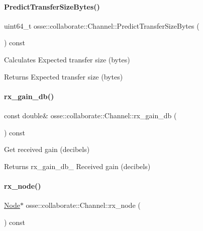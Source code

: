 \paragraph{\texorpdfstring{Predict\+Transfer\+Size\+Bytes()}{PredictTransferSizeBytes()}}
{\footnotesize\ttfamily uint64\+\_\+t osse\+::collaborate\+::\+Channel\+::\+Predict\+Transfer\+Size\+Bytes (\begin{DoxyParamCaption}{ }\end{DoxyParamCaption}) const}



Calculates Expected transfer size (bytes) 

\begin{DoxyReturn}{Returns}
Expected transfer size (bytes) 
\end{DoxyReturn}
\mbox{\label{classosse_1_1collaborate_1_1_channel_a4027ef876124bbe4cf0bd4b00acaf884}} 
\paragraph{\texorpdfstring{rx\+\_\+gain\+\_\+db()}{rx\_gain\_db()}}
{\footnotesize\ttfamily const double\& osse\+::collaborate\+::\+Channel\+::rx\+\_\+gain\+\_\+db (\begin{DoxyParamCaption}{ }\end{DoxyParamCaption}) const\hspace{0.3cm}{\ttfamily [inline]}}



Get received gain (decibels) 

\begin{DoxyReturn}{Returns}
rx\+\_\+gain\+\_\+db\+\_\+ Received gain (decibels) 
\end{DoxyReturn}
\mbox{\label{classosse_1_1collaborate_1_1_channel_abc1c2e786daa390bcd1cd0982566e5f2}} 
\paragraph{\texorpdfstring{rx\+\_\+node()}{rx\_node()}}
{\footnotesize\ttfamily \hyperlink{classosse_1_1collaborate_1_1_node}{Node}$\ast$ osse\+::collaborate\+::\+Channel\+::rx\+\_\+node (\begin{DoxyParamCaption}{ }\end{DoxyParamCaption}) const\hspace{0.3cm}{\ttfamily [inline]}}



